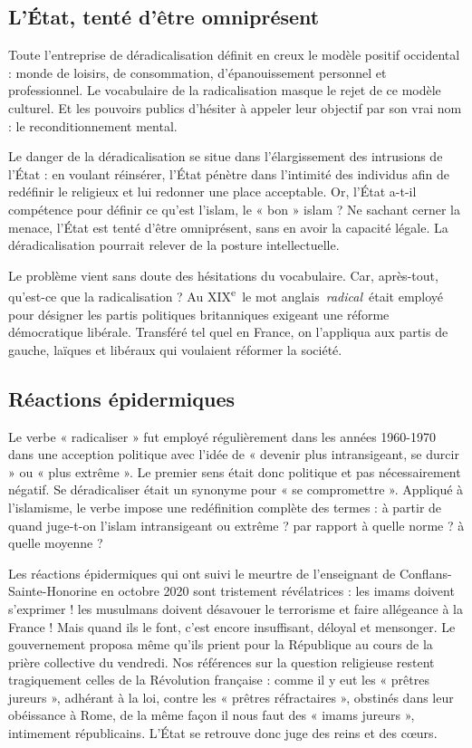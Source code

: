 \subsection{L'État, tenté d'être omniprésent}

Toute l'entreprise de déradicalisation définit en creux le modèle
positif occidental : monde de loisirs, de consommation, d'épanouissement
personnel et professionnel. Le vocabulaire de la radicalisation masque
le rejet de ce modèle culturel. Et les pouvoirs publics d'hésiter à
appeler leur objectif par son vrai nom : le reconditionnement mental.

Le danger de la déradicalisation se situe dans l'élargissement des
intrusions de l'État : en voulant réinsérer, l'État pénètre dans
l'intimité des individus afin de redéfinir le religieux et lui redonner
une place acceptable. Or, l'État a-t-il compétence pour définir ce
qu'est l'islam, le « bon » islam ? Ne sachant cerner la menace, l'État
est tenté d'être omniprésent, sans en avoir la capacité légale. La
déradicalisation pourrait relever de la posture intellectuelle.

Le problème vient sans doute des hésitations du vocabulaire. Car,
après-tout, qu'est-ce que la radicalisation ? Au
XIX\textsuperscript{e}~le mot anglais~\emph{radical}~était employé pour
désigner les partis politiques britanniques exigeant une réforme
démocratique libérale. Transféré tel quel en France, on l'appliqua aux
partis de gauche, laïques et libéraux qui voulaient réformer la société.

\subsection{Réactions épidermiques}

Le verbe « radicaliser » fut employé régulièrement dans les années
1960-1970 dans une acception politique avec l'idée de « devenir plus
intransigeant, se durcir » ou « plus extrême ». Le premier sens était
donc politique et pas nécessairement négatif. Se déradicaliser était un
synonyme pour « se compromettre ». Appliqué à l'islamisme, le verbe
impose une redéfinition complète des termes : à partir de quand
juge-t-on l'islam intransigeant ou extrême ? par rapport à quelle norme
? à quelle moyenne ?

Les réactions épidermiques qui ont suivi le meurtre de l'enseignant de
Conflans-Sainte-Honorine en octobre 2020 sont tristement révélatrices :
les imams doivent s'exprimer ! les musulmans doivent désavouer le
terrorisme et faire allégeance à la France ! Mais quand ils le font,
c'est encore insuffisant, déloyal et mensonger. Le gouvernement proposa
même qu'ils prient pour la République au cours de la prière collective
du vendredi. Nos références sur la question religieuse restent
tragiquement celles de la Révolution française : comme il y eut les «
prêtres jureurs », adhérant à la loi, contre les « prêtres réfractaires
», obstinés dans leur obéissance à Rome, de la même façon il nous faut
des « imams jureurs », intimement républicains. L'État se retrouve donc
juge des reins et des cœurs.

